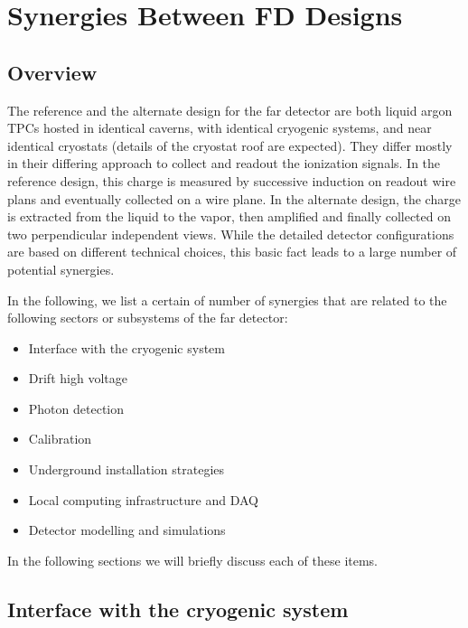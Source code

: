 \chapter{Synergies Between FD Designs}
\label{ch:detectors-synergy}

\section{Overview}

The reference and the alternate design for the far detector are both
liquid argon TPCs hosted in identical caverns, with identical
cryogenic systems, and near identical cryostats (details of the
cryostat roof are expected). They differ mostly in their differing
approach to collect and readout the ionization signals. In the
reference design, this charge is measured by successive induction on
readout wire plans and eventually collected on a wire plane. In the
alternate design, the charge is extracted from the liquid to the
vapor, then amplified and finally collected on two perpendicular
independent views. While the detailed detector configurations are
based on different technical choices, this basic fact leads to a large
number of potential synergies.

In the following, we list a certain of number of synergies that are
related to the following sectors or subsystems of the far detector:
\begin{itemize}
\item Interface with the cryogenic system
\item Drift high voltage 
\item Photon detection
\item Calibration
\item Underground installation strategies
\item Local computing infrastructure and DAQ
\item Detector modelling and simulations
\end{itemize}

In the following sections we will briefly discuss each of these items. 
  


\section{Interface with the cryogenic system}

